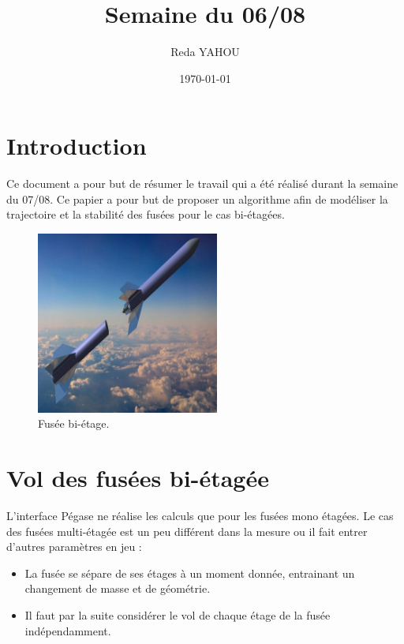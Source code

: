 \documentclass[a4paper]{article}
\title{Semaine du 06/08}
\author{Reda YAHOU}
\date{\today}
\begin{document}
\maketitle

\section*{Introduction}

Ce document a pour but de résumer le travail qui a été réalisé durant la semaine du 07/08. Ce papier a pour but de proposer un algorithme afin de modéliser la trajectoire et la stabilité des fusées pour le cas bi-étagées.\\




\begin{figure}[!htbp]
\begin{center}
\includegraphics[width=6cm]{complet-1024x494.jpg} 
\end{center}
\caption{Fusée bi-étage.}
\end{figure}





\section{Vol des fusées bi-étagée}

L'interface Pégase ne réalise les calculs que pour les fusées mono étagées. Le cas des fusées multi-étagée est un peu différent dans la mesure ou il fait entrer d'autres paramètres en jeu : \\

\begin{itemize}
\item La fusée se sépare de ses étages à un moment donnée, entrainant un changement de masse et de géométrie.
\item Il faut par la suite considérer le vol de chaque étage de la fusée indépendamment.
\end{itemize}
\end{document}
